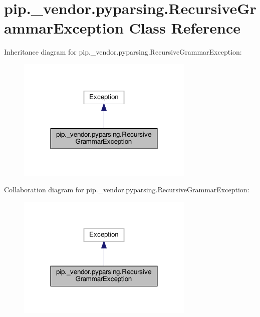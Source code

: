 \hypertarget{classpip_1_1__vendor_1_1pyparsing_1_1RecursiveGrammarException}{}\section{pip.\+\_\+vendor.\+pyparsing.\+Recursive\+Grammar\+Exception Class Reference}
\label{classpip_1_1__vendor_1_1pyparsing_1_1RecursiveGrammarException}


Inheritance diagram for pip.\+\_\+vendor.\+pyparsing.\+Recursive\+Grammar\+Exception\+:
\nopagebreak
\begin{figure}[H]
\begin{center}
\leavevmode
\includegraphics[width=239pt]{classpip_1_1__vendor_1_1pyparsing_1_1RecursiveGrammarException__inherit__graph}
\end{center}
\end{figure}


Collaboration diagram for pip.\+\_\+vendor.\+pyparsing.\+Recursive\+Grammar\+Exception\+:
\nopagebreak
\begin{figure}[H]
\begin{center}
\leavevmode
\includegraphics[width=239pt]{classpip_1_1__vendor_1_1pyparsing_1_1RecursiveGrammarException__coll__graph}
\end{center}
\end{figure}
